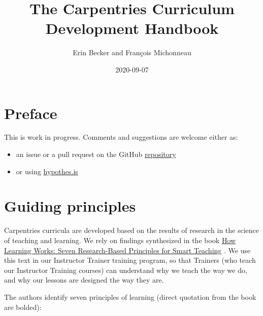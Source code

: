 \documentclass[
]{book}
\title{The Carpentries Curriculum Development Handbook}
\author{Erin Becker and François Michonneau}
\date{2020-09-07}
\providecommand{\tightlist}{%
  \setlength{\itemsep}{0pt}\setlength{\parskip}{0pt}}
\begin{document}
\maketitle

{
\setcounter{tocdepth}{1}
\tableofcontents
}
\hypertarget{preface}{%
\chapter*{Preface}\label{preface}}

This is work in progress. Comments and suggestions are welcome either as:

\begin{itemize}
\tightlist
\item
  an issue or a pull request on the GitHub \href{https://github.com/carpentries/curriculum-development}{repository}
\item
  or using \href{https://web.hypothes.is/start/}{hypothes.is}
\end{itemize}

\hypertarget{guiding-principles}{%
\chapter{Guiding principles}\label{guiding-principles}}

Carpentries curricula are developed based on the results of research in the science of
teaching and learning. We rely on findings synthesized in the book
\href{https://www.wiley.com/en-us/How+Learning+Works\%3A+Seven+Research+Based+Principles+for+Smart+Teaching-p-9780470484104}{How Learning Works: Seven Research-Based Principles for Smart Teaching} \citep{ambrose2010learning}. We use this text in our Instructor Trainer training program, so that
Trainers (who teach our Instructor Training courses) can understand why we teach the way we
do, and why our lessons are designed the way they are.

The authors identify seven principles of learning (direct quotation from the book are bolded):
\end{document}
